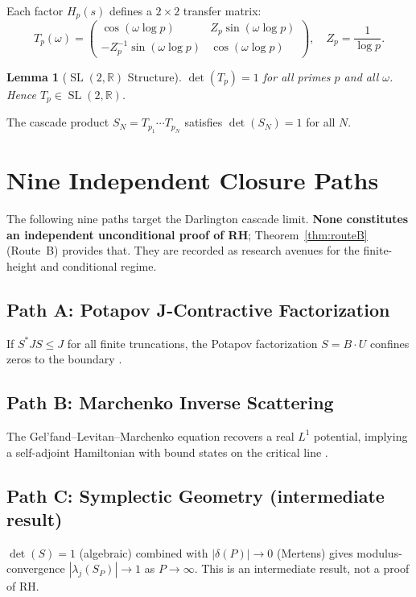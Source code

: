\documentclass[11pt,reqno]{amsart}
\newtheorem{lemma}[theorem]{Lemma}
\begin{document}
Each factor $H_p(s)$ defines a $2 \times 2$ transfer matrix:
\begin{equation}
  T_p(\omega) = \begin{pmatrix}
    \cos(\omega \log p) & Z_p \sin(\omega \log p) \\
    -Z_p^{-1} \sin(\omega \log p) & \cos(\omega \log p)
  \end{pmatrix}, \quad Z_p = \frac{1}{\log p}.
\end{equation}

\begin{lemma}[$\operatorname{SL}(2,\mathbb{R})$ Structure]
$\det(T_p) = 1$ for all primes $p$ and all $\omega$.
Hence $T_p \in \operatorname{SL}(2, \mathbb{R})$.
\end{lemma}

The cascade product $S_N = T_{p_1} \cdots T_{p_N}$ satisfies
$\det(S_N) = 1$ for all $N$.

\section{Nine Independent Closure Paths}
\label{sec:closure}

The following nine paths target the Darlington cascade limit.
\textbf{None constitutes an independent unconditional proof of RH};
Theorem~\ref{thm:routeB} (Route~B) provides that.
They are recorded as research avenues for the finite-height and conditional regime.

\subsection{Path A: Potapov J-Contractive Factorization}
If $S^* J S \leq J$ for all finite truncations, the Potapov factorization
$S = B \cdot U$ confines zeros to the boundary \cite{potapov60}.

\subsection{Path B: Marchenko Inverse Scattering}
The Gel'fand--Levitan--Marchenko equation recovers a real $L^1$ potential,
implying a self-adjoint Hamiltonian with bound states on the critical line
\cite{gelfand-levitan51,deift-trubowitz79}.

\subsection{Path C: Symplectic Geometry (intermediate result)}
$\det(S) = 1$ (algebraic) combined with $|\delta(P)| \to 0$ (Mertens) gives
modulus-convergence $|\lambda_j(S_P)| \to 1$ as $P \to \infty$.
This is an intermediate result, not a proof of RH.
\end{document}
